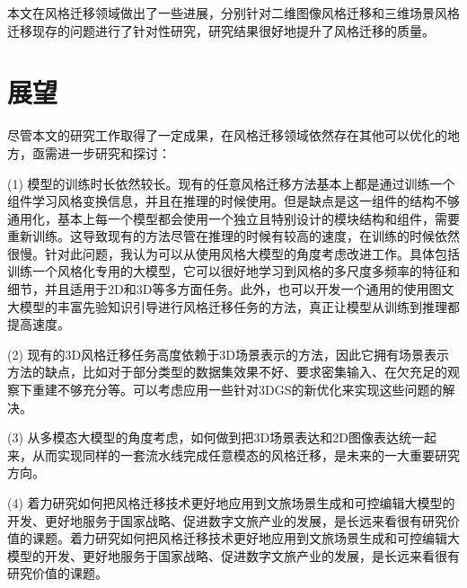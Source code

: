 \par 本文在风格迁移领域做出了一些进展，分别针对二维图像风格迁移和三维场景风格迁移现存的问题进行了针对性研究，研究结果很好地提升了风格迁移的质量。
\section{展望}
尽管本文的研究工作取得了一定成果，在风格迁移领域依然存在其他可以优化的地方，亟需进一步研究和探讨：
\par (1) 模型的训练时长依然较长。现有的任意风格迁移方法基本上都是通过训练一个组件学习风格变换信息，并且在推理的时候使用。但是缺点是这一组件的结构不够通用化，基本上每一个模型都会使用一个独立且特别设计的模块结构和组件，需要重新训练。这导致现有的方法尽管在推理的时候有较高的速度，在训练的时候依然很慢。针对此问题，我认为可以从使用风格大模型的角度考虑改进工作。具体包括训练一个风格化专用的大模型，它可以很好地学习到风格的多尺度多频率的特征和细节，并且适用于2D和3D等多方面任务。此外，也可以开发一个通用的使用图文大模型的丰富先验知识引导进行风格迁移任务的方法，真正让模型从训练到推理都提高速度。
\par (2) 现有的3D风格迁移任务高度依赖于3D场景表示的方法，因此它拥有场景表示方法的缺点，比如对于部分类型的数据集效果不好、要求密集输入、在欠充足的观察下重建不够充分等。可以考虑应用一些针对3DGS的新优化来实现这些问题的解决。
\par (3) 从多模态大模型的角度考虑，如何做到把3D场景表达和2D图像表达统一起来，从而实现同样的一套流水线完成任意模态的风格迁移，是未来的一大重要研究方向。
\par (4) 着力研究如何把风格迁移技术更好地应用到文旅场景生成和可控编辑大模型的开发、更好地服务于国家战略、促进数字文旅产业的发展，是长远来看很有研究价值的课题。着力研究如何把风格迁移技术更好地应用到文旅场景生成和可控编辑大模型的开发、更好地服务于国家战略、促进数字文旅产业的发展，是长远来看很有研究价值的课题。